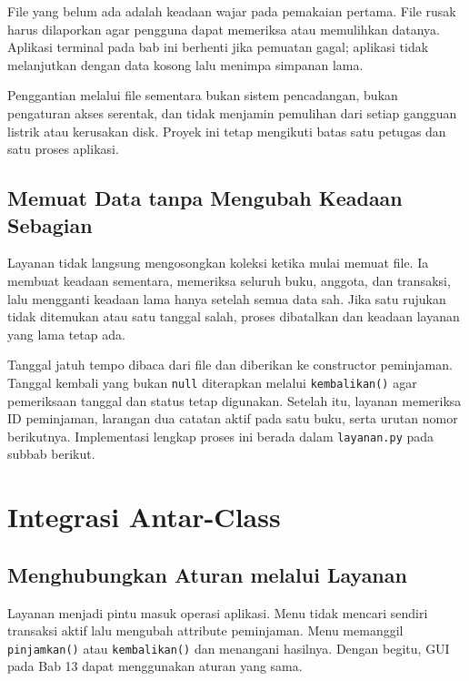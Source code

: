 \begin{penting}
File yang belum ada adalah keadaan wajar pada pemakaian pertama. File rusak harus dilaporkan agar pengguna dapat memeriksa atau memulihkan datanya. Aplikasi terminal pada bab ini berhenti jika pemuatan gagal; aplikasi tidak melanjutkan dengan data kosong lalu menimpa simpanan lama.

Penggantian melalui file sementara bukan sistem pencadangan, bukan pengaturan akses serentak, dan tidak menjamin pemulihan dari setiap gangguan listrik atau kerusakan disk. Proyek ini tetap mengikuti batas satu petugas dan satu proses aplikasi.
\end{penting}

\subsection{Memuat Data tanpa Mengubah Keadaan Sebagian}

Layanan tidak langsung mengosongkan koleksi ketika mulai memuat file. Ia membuat keadaan sementara, memeriksa seluruh buku, anggota, dan transaksi, lalu mengganti keadaan lama hanya setelah semua data sah. Jika satu rujukan tidak ditemukan atau satu tanggal salah, proses dibatalkan dan keadaan layanan yang lama tetap ada.

Tanggal jatuh tempo dibaca dari file dan diberikan ke constructor peminjaman. Tanggal kembali yang bukan \texttt{null} diterapkan melalui \texttt{kembalikan()} agar pemeriksaan tanggal dan status tetap digunakan. Setelah itu, layanan memeriksa ID peminjaman, larangan dua catatan aktif pada satu buku, serta urutan nomor berikutnya. Implementasi lengkap proses ini berada dalam \texttt{layanan.py} pada subbab berikut.

\section{Integrasi Antar-Class}

\subsection{Menghubungkan Aturan melalui Layanan}

Layanan menjadi pintu masuk operasi aplikasi. Menu tidak mencari sendiri transaksi aktif lalu mengubah attribute peminjaman. Menu memanggil \texttt{pinjamkan()} atau \texttt{kembalikan()} dan menangani hasilnya. Dengan begitu, GUI pada Bab 13 dapat menggunakan aturan yang sama.

